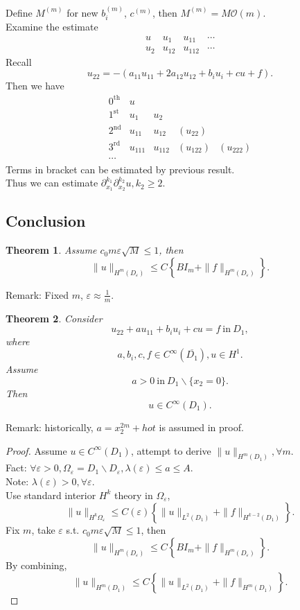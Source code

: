 \documentclass[12pt]{article}
\newtheorem{theorem}{Theorem}
\begin{document}
Define $ M^{(m)} $ for new $ b^{(m)}_i $, $ c^{(m)} $, then $ M^{(m)} = M\mathcal{O}(m)$.\\
Examine the estimate
\begin{equation*}
\begin{array}{cccc}
	u & u_1 & u_{11} & \cdots \\
	u_2 & u_{12} & u_{112} & \cdots
\end{array}
\end{equation*}
Recall
\[ u_{22} = -(a_{11}u_{11} + 2a_{12}u_{12} + b_iu_i + cu + f). \]
Then we have
\begin{equation*}
\begin{array}{ccccc}
\mathrm{0^{th}} & u & & & \\
\mathrm{1^{st}} & u_1 & u_2 & & \\
\mathrm{2^{nd}} & u_{11} & u_{12} & (u_{22}) & \\
\mathrm{3^{rd}} & u_{111} & u_{112} & (u_{122}) & (u_{222}) \\
\cdots & & & & 
\end{array}
\end{equation*}
Terms in bracket can be estimated by previous result.\\
Thus we can estimate $ \partial_{x_1}^{k_1}\partial_{x_2}^{k_2}u, k_2\ge2. $

\subsection{Conclusion}
\begin{theorem}
Assume $ c_0m\varepsilon \sqrt{M}\le1 $, then
\[ \| u \|_{H^m(D_\varepsilon)} \le C\left\{ BI_m + \| f \|_{H^m(D_\varepsilon)} \right\}. \]
\end{theorem}
Remark: Fixed $m$, $\varepsilon \approx \frac{1}{m}$.
\begin{theorem}
Consider 
\[ u_{22}+au_{11} +b_iu_i+cu = f\mathrm{\ in\ }D_1,\]
where 
\[ a, b_i, c, f \in C^\infty\left(\overline{D_1}\right), u \in H^1. \]
Assume 
\[ a > 0 \mathrm{\ in\ }D_1 \backslash \{ x_2 = 0 \}. \]
Then
\[ u \in C^\infty(D_1). \]
\end{theorem}
Remark: historically, $ a = x_2^{2m} + {hot} $ is assumed in proof.
\begin{proof}
	Assume $ u\in C^\infty(D_1) $, attempt to derive $\|u\|_{H^m(D_1)}, \forall m$.\\
	Fact: $ \forall \varepsilon > 0, \Omega_\varepsilon = D_1 \backslash D_\varepsilon, \lambda(\varepsilon) \le a \le A. $\\
	Note: $\lambda(\varepsilon)>0, \forall \varepsilon.$\\
	Use standard interior $H^k$ theory in $\Omega_\varepsilon$,
	\[ \|u\|_{H^k{\Omega_\varepsilon}}\le C(\varepsilon)\left\{ \|u\|_{L^2(D_1)} + \|f\|_{H^{k-2}(D_1)} \right\} .\]
	Fix $m$, take $\varepsilon$ s.t. $c_0m\varepsilon\sqrt{M}\le1$, then
	\[ \|u\|_{H^m(D_\varepsilon)}\le C\left\{ BI_m + \|f\|_{H^m(D_\varepsilon)} \right\} .\]
	By combining,
	\[ \|u\|_{H^m(D_1)}\le C\left\{ \|u\|_{L^2(D_1)} + \|f\|_{H^m(D_1)} \right\} .\]
\end{proof}
\end{document}
